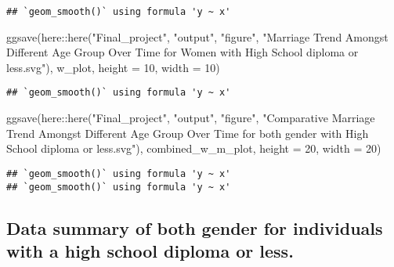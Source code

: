 \documentclass[
]{article}
\newenvironment{Shaded}{\begin{snugshade}}{\end{snugshade}}
\newcommand{\AttributeTok}[1]{\textcolor[rgb]{0.77,0.63,0.00}{#1}}
\newcommand{\DecValTok}[1]{\textcolor[rgb]{0.00,0.00,0.81}{#1}}
\newcommand{\FunctionTok}[1]{\textcolor[rgb]{0.00,0.00,0.00}{#1}}
\newcommand{\NormalTok}[1]{#1}
\newcommand{\SpecialCharTok}[1]{\textcolor[rgb]{0.00,0.00,0.00}{#1}}
\newcommand{\StringTok}[1]{\textcolor[rgb]{0.31,0.60,0.02}{#1}}
\begin{document}
\begin{verbatim}
## `geom_smooth()` using formula 'y ~ x'
\end{verbatim}

\begin{Shaded}
\begin{Highlighting}[]
\FunctionTok{ggsave}\NormalTok{(here}\SpecialCharTok{::}\FunctionTok{here}\NormalTok{(}\StringTok{"Final\_project"}\NormalTok{, }\StringTok{"output"}\NormalTok{, }\StringTok{"figure"}\NormalTok{,}
                  \StringTok{"Marriage Trend Amongst Different Age Group Over Time for Women with High School diploma or less.svg"}\NormalTok{),}
\NormalTok{       w\_plot,}
       \AttributeTok{height =} \DecValTok{10}\NormalTok{,}
       \AttributeTok{width =} \DecValTok{10}\NormalTok{)}
\end{Highlighting}
\end{Shaded}

\begin{verbatim}
## `geom_smooth()` using formula 'y ~ x'
\end{verbatim}

\begin{Shaded}
\begin{Highlighting}[]
\FunctionTok{ggsave}\NormalTok{(here}\SpecialCharTok{::}\FunctionTok{here}\NormalTok{(}\StringTok{"Final\_project"}\NormalTok{, }\StringTok{"output"}\NormalTok{, }\StringTok{"figure"}\NormalTok{,}
                  \StringTok{"Comparative Marriage Trend Amongst Different Age Group Over Time for both gender with High School diploma or less.svg"}\NormalTok{),}
\NormalTok{       combined\_w\_m\_plot,}
       \AttributeTok{height =} \DecValTok{20}\NormalTok{,}
       \AttributeTok{width =} \DecValTok{20}\NormalTok{)}
\end{Highlighting}
\end{Shaded}

\begin{verbatim}
## `geom_smooth()` using formula 'y ~ x'
## `geom_smooth()` using formula 'y ~ x'
\end{verbatim}

\hypertarget{data-summary-of-both-gender-for-individuals-with-a-high-school-diploma-or-less.}{%
\subsection{Data summary of both gender for individuals with a high
school diploma or
less.}\label{data-summary-of-both-gender-for-individuals-with-a-high-school-diploma-or-less.}}
\end{document}
